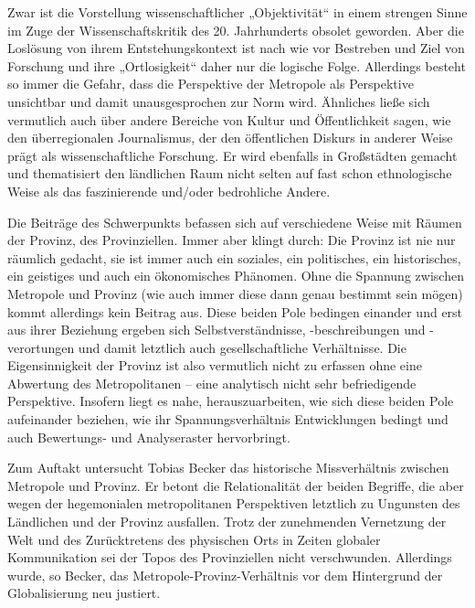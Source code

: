 \begin{multicols*}{2}
Zwar ist die Vorstellung wissenschaftlicher „Objektivität“ in einem strengen Sinne im Zuge der Wissenschaftskritik des 20. Jahrhunderts obsolet geworden. Aber die Loslösung von ihrem Entstehungskontext ist nach wie vor Bestreben und Ziel von Forschung und ihre „Ortlosigkeit“ daher nur die logische Folge. Allerdings besteht so immer die Gefahr, dass die Perspektive der Metropole als Perspektive unsichtbar und damit unausgesprochen zur Norm wird. Ähnliches ließe sich vermutlich auch über andere Bereiche von Kultur und Öffentlichkeit sagen, wie den überregionalen Journalismus, der den öffentlichen Diskurs in anderer Weise prägt als wissenschaftliche Forschung. Er wird ebenfalls in Großstädten gemacht und thematisiert den ländlichen Raum nicht selten auf fast schon ethnologische Weise als das faszinierende und/oder bedrohliche Andere. 

Die Beiträge des Schwerpunkts befassen sich auf verschiedene Weise mit Räumen der Provinz, des Provinziellen. Immer aber klingt durch: Die Provinz ist nie nur räumlich gedacht, sie ist immer auch ein soziales, ein politisches, ein historisches, ein geistiges und auch ein ökonomisches Phänomen. Ohne die Spannung zwischen Metropole und Provinz (wie auch immer diese dann genau bestimmt sein mögen) kommt allerdings kein Beitrag aus. Diese beiden Pole bedingen einander und erst aus ihrer Beziehung ergeben sich  Selbstverständnisse, -beschreibungen und -verortungen und damit letztlich auch gesellschaftliche Verhältnisse. Die Eigensinnigkeit der Provinz ist also vermutlich nicht zu erfassen ohne eine Abwertung des Metropolitanen – eine analytisch nicht sehr befriedigende Perspektive. Insofern liegt es nahe, herauszuarbeiten, wie sich diese beiden Pole aufeinander beziehen, wie ihr Spannungsverhältnis Entwicklungen bedingt und auch Bewertungs- und Analyseraster hervorbringt.

Zum Auftakt untersucht Tobias Becker das historische Missverhältnis zwischen Metropole und Provinz. Er betont die Relationalität der beiden Begriffe, die aber wegen der hegemonialen metropolitanen Perspektiven letztlich zu Ungunsten des Ländlichen und der Provinz ausfallen. Trotz der zunehmenden Vernetzung der Welt und des Zurücktretens des physischen Orts in Zeiten globaler Kommunikation sei der Topos des Provinziellen nicht verschwunden. Allerdings wurde, so Becker, das Metropole-Provinz-Verhältnis vor dem Hintergrund der Globalisierung neu justiert.


\end{multicols*}
